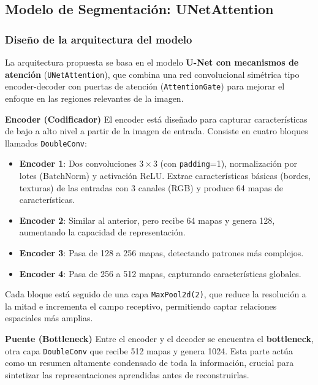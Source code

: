 \subsection{Modelo de Segmentación: UNetAttention}

\subsubsection{Diseño de la arquitectura del modelo}


La arquitectura propuesta se basa en el modelo \textbf{U-Net con mecanismos de atención} (\texttt{UNetAttention}), que combina una red convolucional simétrica tipo encoder-decoder con puertas de atención (\texttt{AttentionGate}) para mejorar el enfoque en las regiones relevantes de la imagen.

\textbf{Encoder (Codificador)}
El encoder está diseñado para capturar características de bajo a alto nivel a partir de la imagen de entrada. Consiste en cuatro bloques llamados \texttt{DoubleConv}:
\begin{itemize}
    \item \textbf{Encoder 1}: Dos convoluciones $3\times3$ (con \texttt{padding}=1), normalización por lotes (BatchNorm) y activación ReLU. Extrae características básicas (bordes, texturas) de las entradas con 3 canales (RGB) y produce 64 mapas de características.
    \item \textbf{Encoder 2}: Similar al anterior, pero recibe 64 mapas y genera 128, aumentando la capacidad de representación.
    \item \textbf{Encoder 3}: Pasa de 128 a 256 mapas, detectando patrones más complejos.
    \item \textbf{Encoder 4}: Pasa de 256 a 512 mapas, capturando características globales.
\end{itemize}
Cada bloque está seguido de una capa \texttt{MaxPool2d(2)}, que reduce la resolución a la mitad e incrementa el campo receptivo, permitiendo captar relaciones espaciales más amplias.

\textbf{Puente (Bottleneck)}
Entre el encoder y el decoder se encuentra el \textbf{bottleneck}, otra capa \texttt{DoubleConv} que recibe 512 mapas y genera 1024. Esta parte actúa como un resumen altamente condensado de toda la información, crucial para sintetizar las representaciones aprendidas antes de reconstruirlas.

